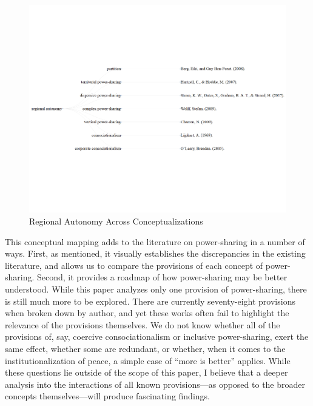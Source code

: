 \documentclass[12pt]{article}
\begin{document}
\begin{figure}[H]
	\begin{center}
		\includegraphics[width = 6in]{reg_aut_ontology_vis.png}
	\end{center}
\caption{Regional Autonomy Across Conceptualizations}
\end{figure}

This conceptual mapping adds to the literature on power-sharing in a number of ways. First, as mentioned, it visually establishes the discrepancies in the existing literature, and allows us to compare the provisions of each concept of power-sharing. Second, it provides a roadmap of how power-sharing may be better understood. While this paper analyzes only one provision of power-sharing, there is still much more to be explored. There are currently seventy-eight provisions when broken down by author, and yet these works often fail to highlight the relevance of the provisions themselves. We do not know whether all of the provisions of, say, coercive consociationalism or inclusive power-sharing, exert the same effect, whether some are redundant, or whether, when it comes to the institutionalization of peace, a simple case of ``more is better'' applies. While these questions lie outside of the scope of this paper, I believe that a deeper analysis into the interactions of all known provisions---as opposed to the broader concepts themselves---will produce fascinating findings. 
\end{document}
